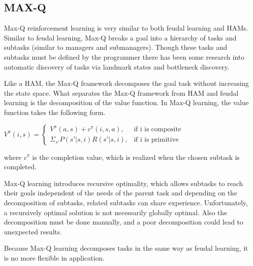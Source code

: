 \subsection{MAX-Q}
Max-Q reinforcement learning is very similar to both feudal learning and
HAMs. Similar to feudal learning, Max-Q breaks a goal into a hierarchy of tasks
and subtasks (similar to managers and submanagers). Though these tasks and
subtasks must be defined by the programmer there has been some research into
automatic discovery of tasks via landmark states and bottleneck discovery.

Like a HAM, the Max-Q framework decomposes the goal task without increasing
the state space. What separates the Max-Q framework from HAM and feudal
learning is the decomposition of the value function. In Max-Q learning, the
value function takes the following form.

\begin{math}
V^{\pi}(i, s) =
\begin{cases}
V^{\pi}(a, s) + c^{\pi}(i, s, a), & \text{if i is composite}\\
\Sigma_{s'}P(s'|s, i)R(s'|s, i), & \text{if i is primitive}
\end{cases}
\end{math}

where $c^{\pi}$ is the completion value, which is realized when the chosen
subtask is completed. \cite{Dietterich}

Max-Q learning introduces recursive optimality, which allows subtasks to reach
their goals independent of the needs of the parent task and depending on the
decomposition of subtasks, related subtasks can share experience. Unfortunately,
a recursively optimal solution is not necessarily globally optimal. Also
the decomposition must be done manually, and a poor decomposition could lead
to unexpected results.

Because Max-Q learning decomposes tasks in the same way as feudal learning, it is no more flexible in application.


